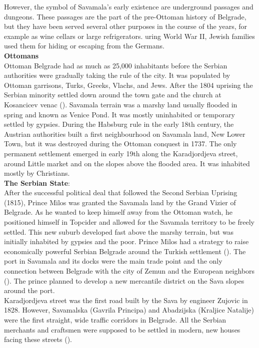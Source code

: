 \documentclass[11pt]{report}
\begin{document}
However, the symbol of Savamala's early existence are underground passages and dungeons. These passages are the part of the pre-Ottoman history of Belgrade, but they have been served several other purposes in the course of the years, for example as wine cellars or large refrigerators. 
uring World War II, Jewish families used them for hiding or escaping from the Germans.
\\
\textbf{Ottomans}
\\
Ottoman Belgrade had as much as 25,000 inhabitants before the Serbian authorities were gradually taking the rule of the city.
It was populated by Ottoman garrisons, Turks, Greeks, Vlachs, and Jews.
After the 1804 uprising the Serbian minority settled down around the town gate and the church at Kosancicev venac (\cite{Roter Blagojevic in Doytchinov 2015}).
Savamala terrain was a marshy land usually flooded in spring and known as Venice Pond.
It was mostly uninhabited or temporary settled by gypsies.
During the Habsburg rule in the early 18th century, the Austrian authorities built a first neighbourhood on Savamala land, New Lower Town, but it was destroyed during the Ottoman conquest in 1737. The only permanent settlement emerged in early 19th along the Karadjordjeva street, around Little market and on the slopes above the flooded area. It was inhabited mostly by Christians.
\\
\textbf{The Serbian State}:
\\
After the successful political deal that followed the Second Serbian Uprising (1815), Prince Milos was granted the Savamala land by the Grand Vizier of Belgrade.
As he wanted to keep himself away from the Ottoman watch, he positioned himself in Topcider and allowed for the Savamala territory to be freely settled.
This new suburb developed fast above the marshy terrain, but was initially inhabited by gypsies and the poor.
Prince Milos had a strategy to raise economically powerful Serbian Belgrade around the Turkish settlement (\cite{bureau savamala}).
The port in Savamala and its docks were the main trade point and the only connection between Belgrade with the city of Zemun and the European neighbors (\cite{Roter Blagojevic in Doytchinov 2015}).
The prince planned to develop a new mercantile district on the Sava slopes around the port. 
\\
Karadjordjeva street was the first road built by the Sava by engineer Zujovic in 1828.
However, Savamalska (Gavrila Principa) and Abadzijska (Kraljice Natalije) were the first straight, wide traffic corridors in Belgrade.
All  the  Serbian  merchants  and  craftsmen  were supposed  to  be settled in modern, new  houses facing these streets (\cite{Roter Blagojevic in Doytchinov 2015}).
\end{document}
